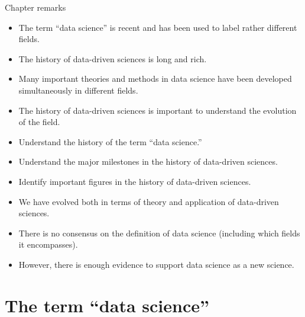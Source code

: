 \begin{mainbox}{Chapter remarks}


  \startcontents[chapters]
  \vspace{1em}


  \begin{itemize}
    \itemsep0em
    \item The term ``data science'' is recent and has been used to label rather different
      fields.
    \item The history of data-driven sciences is long and rich.
    \item Many important theories and methods in data science have been developed
      simultaneously in different fields.
    \item The history of data-driven sciences is important to understand the evolution of
      the field.
  \end{itemize}


  \begin{itemize}
    \itemsep0em
    \item Understand the history of the term ``data science.''
    \item Understand the major milestones in the history of data-driven sciences.
    \item Identify important figures in the history of data-driven sciences.
  \end{itemize}


  \begin{itemize}
    \itemsep0em
    \item We have evolved both in terms of theory and application of data-driven sciences.
    \item There is no consensus on the definition of data science (including which fields
      it encompasses).
    \item However, there is enough evidence to support data science as a new science.
  \end{itemize}
\end{mainbox}

{}
\clearpage

\section{The term ``data science''}

